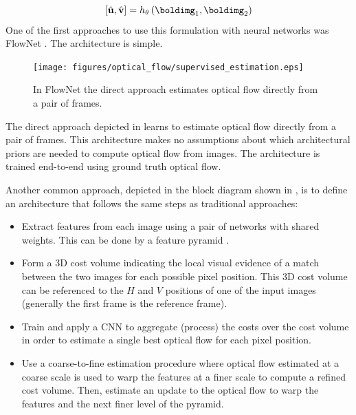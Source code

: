 \begin{equation}
    \left[ \hat{\mathbf{u}}, \hat{\mathbf{v}} \right] =
    h_\theta \left( \boldimg_1, \boldimg_2 \right)
\end{equation}
One of the first approaches to use this formulation with neural networks was FlowNet \cite{Dosovitskiy2015}. The architecture is simple.

\vspace{-.2in}
\begin{figure}[h!]
    \centerline{
        \texttt{[image: figures/optical\_flow/supervised\_estimation.eps]}}
    \caption{In FlowNet the direct approach estimates optical flow directly from a pair of frames.}
    \label{fig:supervised_estimation}
\end{figure}
\vspace{-.2in}
The direct approach depicted in \fig{\ref{fig:supervised_estimation}} learns to estimate optical flow directly from a pair of frames. This architecture makes no assumptions about which architectural priors are needed to compute optical flow from images. The architecture is trained end-to-end using ground truth optical flow.

Another common approach, depicted in the block diagram shown in \fig{\ref{fig:supervised_estimation_modular}}, is to define an architecture that follows the same steps as traditional approaches:

\begin{itemize}
    \item Extract features from each image using a pair of networks with shared weights. This can be done by a feature pyramid \cite{Lin2017}.
    \item Form a 3D cost volume indicating the local visual evidence of a match between the two images for each possible pixel position. This 3D cost volume can be referenced to the $H$ and $V$ positions of one of the input images (generally the first frame is the reference frame).
    \item Train and apply a CNN to aggregate (process) the costs over the  cost volume in order to estimate a single best optical flow for each pixel position.
    \item Use a coarse-to-fine estimation procedure where optical flow estimated at a coarse scale is used to warp the features at a finer scale to compute a refined cost volume. Then, estimate an update to the optical flow to warp the features and the next finer level of the pyramid.
\end{itemize}

